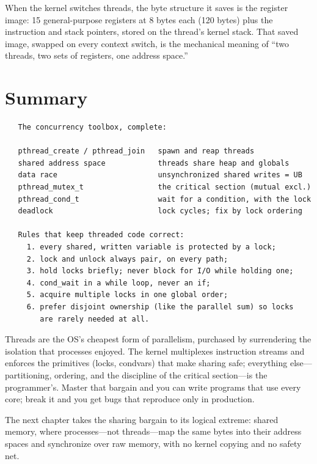 When the kernel switches threads, the byte structure it saves is the
register image: 15 general-purpose registers at 8 bytes each (120
bytes) plus the instruction and stack pointers, stored on the thread's
kernel stack. That saved image, swapped on every context switch, is the
mechanical meaning of ``two threads, two sets of registers, one
address space.''

\section{Summary}

\begin{verbatim}
   The concurrency toolbox, complete:

   pthread_create / pthread_join   spawn and reap threads
   shared address space            threads share heap and globals
   data race                       unsynchronized shared writes = UB
   pthread_mutex_t                 the critical section (mutual excl.)
   pthread_cond_t                  wait for a condition, with the lock
   deadlock                        lock cycles; fix by lock ordering

   Rules that keep threaded code correct:
     1. every shared, written variable is protected by a lock;
     2. lock and unlock always pair, on every path;
     3. hold locks briefly; never block for I/O while holding one;
     4. cond_wait in a while loop, never an if;
     5. acquire multiple locks in one global order;
     6. prefer disjoint ownership (like the parallel sum) so locks
        are rarely needed at all.
\end{verbatim}

\begin{osconcept}
Threads are the OS's cheapest form of parallelism, purchased by
surrendering the isolation that processes enjoyed. The kernel
multiplexes instruction streams and enforces the primitives (locks,
condvars) that make sharing safe; everything else---partitioning,
ordering, and the discipline of the critical section---is the
programmer's. Master that bargain and you can write programs that use
every core; break it and you get bugs that reproduce only in
production.
\end{osconcept}

The next chapter takes the sharing bargain to its logical extreme:
shared memory, where processes---not threads---map the same bytes into
their address spaces and synchronize over raw memory, with no kernel
copying and no safety net.

